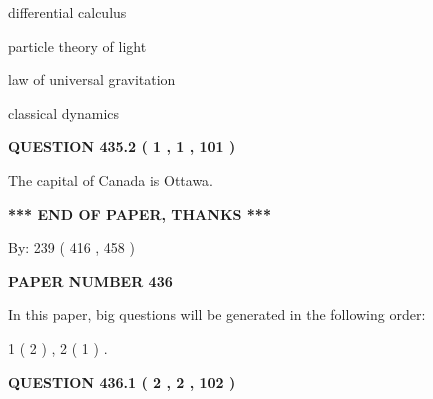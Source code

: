 \documentclass[12pt]{article}
\begin{document}
 
differential calculus
 
 
particle theory of light
 
 
law of universal gravitation
 
 
classical dynamics
 
 
 
 
  
\vspace{0.2in}
  
{\textbf{\Large{QUESTION
435.2 
 ( 1 , 1 , 101 )
}}}
  
  
 
 
\noindent{}
 
 
The capital of Canada is Ottawa.
 
 
 
 
   
   
\vspace{1.0in} 
{\textbf{\large{ *** END OF PAPER, THANKS *** }}} 
   
   
\hspace{1.0in} By: 
 239 ( 416 ,  458 )
   
   
   
   
\newpage 
\setcounter{page}{ 
   436001 } 
   
   
   
   
 {\textbf{ \Large{ PAPER NUMBER  436  }}}
   
   
\vspace{0.2in}
   
   
   
   
   
\vspace{0.2in}
   
In this paper, big questions will be generated in the following order: 
   
   
   1 ( 2 )
 ,
   2 ( 1 )
 .
  
\vspace{0.2in}
  
{\textbf{\Large{QUESTION
436.1 
 ( 2 , 2 , 102 )
}}}
  
  
 
 
\noindent{}
 
\end{document}

